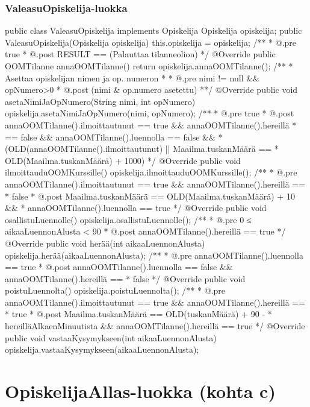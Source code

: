 \subsubsection{ValeasuOpiskelija-luokka}
\label{ValeasuOpiskelija-luokka}
\begin{javacode}
public class ValeasuOpiskelija implements Opiskelija {
  Opiskelija opiskelija;
  public ValeasuOpiskelija(Opiskelija opiskelija) {
    this.opiskelija = opiskelija;
  }
  /**
   * @.pre true
   * @.post RESULT == (Palauttaa tilanneolion)
   */
  @Override
  public OOMTilanne annaOOMTilanne() {
    return opiskelija.annaOOMTilanne();
  }
  /**
   * Asettaa opiskelijan nimen ja op. numeron
   * 
   * @.pre nimi != null && opNumero>0
   * @.post (nimi & op.numero asetettu)
   **/
  @Override
  public void asetaNimiJaOpNumero(String nimi, int opNumero) {
    opiskelija.asetaNimiJaOpNumero(nimi, opNumero);
  }
  /**
   * @.pre true
   * @.post annaOOMTilanne().ilmoittautunut == true && annaOOMTilanne().hereillä
   *        == false && annaOOMTilanne().luennolla == false &&
   *        (OLD(annaOOMTilanne().ilmoittautunut) || Maailma.tuskanMäärä ==
   *        OLD(Maailma.tuskanMäärä) + 1000)
   */
  @Override
  public void ilmoittauduOOMKurssille() {
    opiskelija.ilmoittauduOOMKurssille();
  }
  /**
   * @.pre annaOOMTilanne().ilmoittautunut == true && annaOOMTilanne().hereillä ==
   *       false
   * @.post Maailma.tuskanMäärä == OLD(Maailma.tuskanMäärä) + 10 &&
   *        annaOOMTilanne().luennolla == true
   */
  @Override
  public void osallistuLuennolle() {
    opiskelija.osallistuLuennolle();
  }
  /**
   * @.pre 0 ≤ aikaaLuennonAlusta < 90
   * @.post annaOOMTilanne().hereillä == true
   */
  @Override
  public void herää(int aikaaLuennonAlusta) {
    opiskelija.herää(aikaaLuennonAlusta);
  }
  /**
   * @.pre annaOOMTilanne().luennolla == true
   * @.post annaOOMTilanne().luennolla == false && annaOOMTilanne().hereillä ==
   *        false
   */
  @Override
  public void poistuLuennolta() {
    opiskelija.poistuLuennolta();
  }
  /**
   * @.pre annaOOMTilanne().ilmoittautunut == true && annaOOMTilanne().hereillä ==
   *       true
   * @.post Maailma.tuskanMäärä == OLD(tuskanMäärä) + 90 -
   *        hereilläAlkaenMinuutista && annaOOMTilanne().hereillä == true
   */
  @Override
  public void vastaaKysymykseen(int aikaaLuennonAlusta) {
    opiskelija.vastaaKysymykseen(aikaaLuennonAlusta);
  }
}
\end{javacode}



\section{OpiskelijaAllas-luokka (kohta c)}

